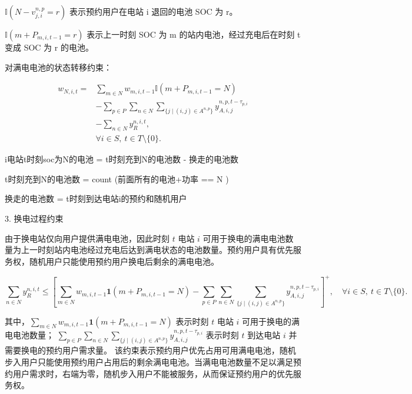 \documentclass[12pt,hyperref,a4paper,UTF8]{ctexart}
\begin{document}
$\mathbb{I}\!\left(N-v^{n,p}_{j,i}=r\right)$
表示预约用户在电站 i 退回的电池 SOC 为 r。

$\mathbb{I}\!\left(m+P_{m,i,t-1}=r\right)$
表示上一时刻 SOC 为 m 的站内电池，经过充电后在时刻 t 变成 SOC 为 r 的电池。

对满电电池的状态转移约束：

\begin{equation}
\begin{aligned}
w_{N,i,t}
=&
\sum_{m\in N}
w_{m,i,t-1}
\mathbb{I}\!\left(m+P_{m,i,t-1}=N\right)
\\
&-
\sum_{p\in P}
\sum_{n\in N}
\sum_{\{j\mid (i,j)\in A^{n,p}\}}
y^{n,p,t-\tau_{p,i}}_{A,i,j}
\\
&-
\sum_{n\in N}
y^{n,i,t}_{R},
\\
&\forall i\in S,\ t\in T\setminus\{0\}.
\end{aligned}
\tag{7b}
\end{equation}

i电站t时刻soc为N的电池 = t时刻充到N的电池数 - 换走的电池数

t时刻充到N的电池数 = count (前面所有的电池+功率 == N )

换走的电池数 = t时刻到达电站i的预约和随机用户


3. 换电过程约束

由于换电站仅向用户提供满电电池，因此时刻 $t$ 电站 $i$ 可用于换电的满电电池数量为上一时刻站内电池经过充电后达到满电状态的电池数量。预约用户具有优先服务权，随机用户只能使用预约用户换电后剩余的满电电池。

\begin{equation}
\sum_{n\in N} y^{n,i,t}_{R}
\le
\left[
\sum_{m\in N} w_{m,i,t-1}
\mathbf{1}\!\left(m+P_{m,i,t-1}=N\right)
-
\sum_{p\in P}
\sum_{n\in N}
\sum_{\{j\mid (i,j)\in A^{n,p}\}}
y^{n,p,t-\tau_{p,i}}_{A,i,j}
\right]^+,
\quad \forall i\in S,\ t\in T\setminus\{0\}.
\tag{8a}
\end{equation}

其中，$\sum_{m\in N} w_{m,i,t-1}\mathbf{1}(m+P_{m,i,t-1}=N)$ 表示时刻 $t$ 电站 $i$ 可用于换电的满电电池数量；
$\sum_{p\in P}
\sum_{n\in N}
\sum_{\{j\mid (i,j)\in A^{n,p}\}}
y^{n,p,t-\tau_{p,i}}_{A,i,j}$ 表示时刻 $t$ 到达电站 $i$ 并需要换电的预约用户需求量。
该约束表示预约用户优先占用可用满电电池，随机步入用户只能使用预约用户占用后的剩余满电电池。当满电电池数量不足以满足预约用户需求时，右端为零，随机步入用户不能被服务，从而保证预约用户的优先服务权。
\end{document}
